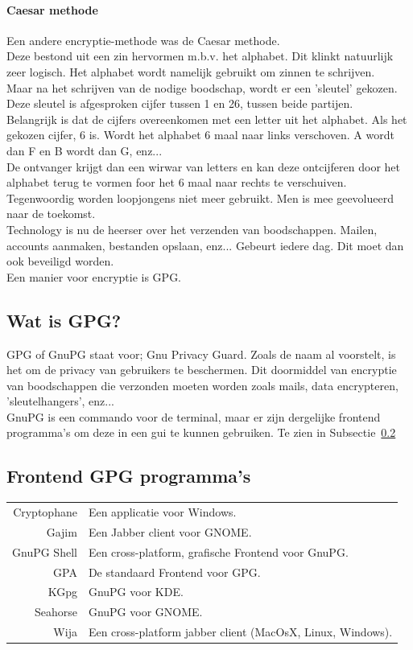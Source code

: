 \documentclass[12pt]{article}
\begin{document}
\paragraph{Caesar methode}
Een andere encryptie-methode was de Caesar methode.\\
Deze bestond uit een zin hervormen m.b.v. het alphabet. Dit klinkt natuurlijk zeer logisch.
Het alphabet wordt namelijk gebruikt om zinnen te schrijven.\\
Maar na het schrijven van de nodige boodschap, wordt er een 'sleutel' gekozen. Deze sleutel is afgesproken cijfer tussen 1 en 26, tussen beide partijen.\\
Belangrijk is dat de cijfers overeenkomen met een letter uit het alphabet. Als het gekozen cijfer, 6 is. Wordt het alphabet 6 maal naar links verschoven. A wordt dan F en B wordt dan G, enz...\\
De ontvanger krijgt dan een wirwar van letters en kan deze ontcijferen door het alphabet terug te vormen foor het 6 maal naar rechts te verschuiven.\\


Tegenwoordig worden loopjongens niet meer gebruikt. Men is mee geevolueerd naar de toekomst.\\
Technology is nu de heerser over het verzenden van boodschappen.
Mailen, accounts aanmaken, bestanden opslaan, enz... Gebeurt iedere dag. Dit moet dan ook beveiligd worden.\\
Een manier voor encryptie is GPG.

\newpage
\subsection{Wat is GPG?}
GPG of GnuPG staat voor; Gnu Privacy Guard. Zoals de naam al voorstelt, is het om de privacy van gebruikers te beschermen. Dit doormiddel van encryptie van boodschappen die verzonden moeten worden zoals mails, data encrypteren, 'sleutelhangers', enz... \\
GnuPG is een commando voor de terminal, maar er zijn dergelijke frontend programma's om deze in een gui te kunnen gebruiken. Te zien in Subsectie~\ref{GUI}

\subsection{Frontend GPG programma's}\label{GUI}
\begin{center}
\begin{tabular}{r|l}
Cryptophane	&	Een applicatie voor Windows.\\
Gajim		&	Een Jabber client voor GNOME.\\
GnuPG Shell	&	Een cross-platform, grafische Frontend voor GnuPG.\\
GPA			&	De standaard Frontend voor GPG.\\
KGpg		&	GnuPG voor KDE.\\
Seahorse	&	GnuPG voor GNOME.\\
Wija		&	Een cross-platform jabber client (MacOsX, Linux, Windows).\\
\end{tabular}
\end{center}
\end{document}
